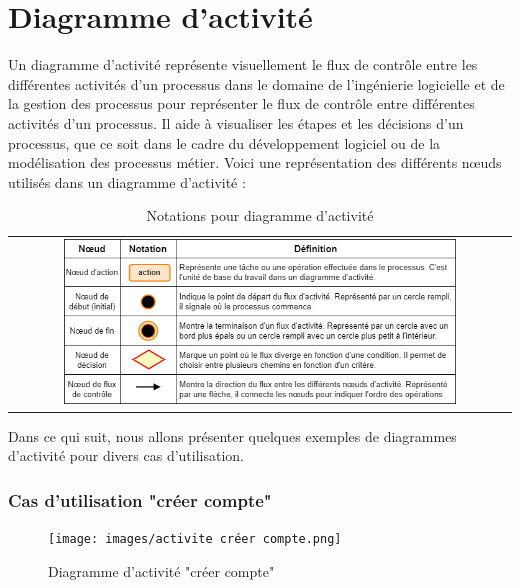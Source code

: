 \documentclass[edit,12pt,a4paper,ChapStyle,oneside,doubleinterligne]{report}
\begin{document}
\section{Diagramme d'activité}
Un diagramme d'activité représente visuellement le flux de contrôle entre les différentes activités d'un processus dans le domaine de l'ingénierie logicielle et de la gestion des processus pour représenter le flux de contrôle entre différentes activités d'un processus. Il aide à visualiser les étapes et les décisions d'un processus, que ce soit dans le cadre du développement logiciel ou de la modélisation des processus métier\cite{activite}.
\newline Voici une représentation des différents nœuds utilisés dans un diagramme d'activité :
\begin{table}[h!]
    \centering
    \begin{tabular}{c}
        \centering
        \includegraphics[width=0.8\textwidth]{images/activity.png}
    \end{tabular}
    \caption{Notations pour diagramme d'activité}
    \label{tab:da}
\end{table}
\clearpage
Dans ce qui suit, nous allons présenter quelques exemples de diagrammes d'activité pour divers cas d'utilisation.
\subsubsection{Cas d'utilisation "créer compte"}
\begin{figure}[h!]\label{fig:activite cree}
    \centering
    \texttt{[image: images/activite créer compte.png]}
    \caption{Diagramme d'activité "créer compte"}
\end{figure}
\clearpage
\end{document}
